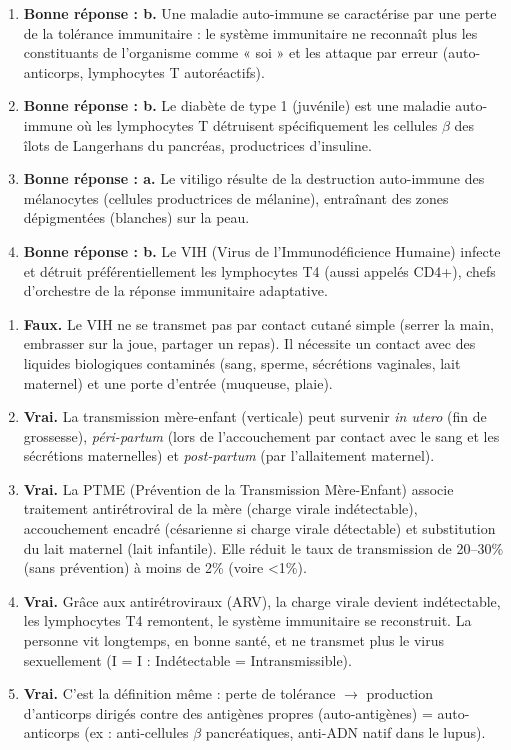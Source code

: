 \documentclass[11pt]{article}
\begin{document}
\begin{corrige}
\begin{enumerate}
\item \textbf{Bonne réponse : b.} Une maladie auto-immune se caractérise par une perte de la tolérance immunitaire : le système immunitaire ne reconnaît plus les constituants de l'organisme comme « soi » et les attaque par erreur (auto-anticorps, lymphocytes T autoréactifs).
\item \textbf{Bonne réponse : b.} Le diabète de type 1 (juvénile) est une maladie auto-immune où les lymphocytes T détruisent spécifiquement les cellules $\beta$ des îlots de Langerhans du pancréas, productrices d'insuline.
\item \textbf{Bonne réponse : a.} Le vitiligo résulte de la destruction auto-immune des mélanocytes (cellules productrices de mélanine), entraînant des zones dépigmentées (blanches) sur la peau.
\item \textbf{Bonne réponse : b.} Le VIH (Virus de l'Immunodéficience Humaine) infecte et détruit préférentiellement les lymphocytes T4 (aussi appelés CD4+), chefs d'orchestre de la réponse immunitaire adaptative.
\end{enumerate}
\end{corrige}

\begin{corrige}
\begin{enumerate}
\item \textbf{Faux.} Le VIH ne se transmet pas par contact cutané simple (serrer la main, embrasser sur la joue, partager un repas). Il nécessite un contact avec des liquides biologiques contaminés (sang, sperme, sécrétions vaginales, lait maternel) et une porte d'entrée (muqueuse, plaie).
\item \textbf{Vrai.} La transmission mère-enfant (verticale) peut survenir \emph{in utero} (fin de grossesse), \emph{péri-partum} (lors de l'accouchement par contact avec le sang et les sécrétions maternelles) et \emph{post-partum} (par l'allaitement maternel).
\item \textbf{Vrai.} La PTME (Prévention de la Transmission Mère-Enfant) associe traitement antirétroviral de la mère (charge virale indétectable), accouchement encadré (césarienne si charge virale détectable) et substitution du lait maternel (lait infantile). Elle réduit le taux de transmission de 20--30\% (sans prévention) à moins de 2\% (voire <1\%).
\item \textbf{Vrai.} Grâce aux antirétroviraux (ARV), la charge virale devient indétectable, les lymphocytes T4 remontent, le système immunitaire se reconstruit. La personne vit longtemps, en bonne santé, et ne transmet plus le virus sexuellement (I = I : Indétectable = Intransmissible).
\item \textbf{Vrai.} C'est la définition même : perte de tolérance $\rightarrow$ production d'anticorps dirigés contre des antigènes propres (auto-antigènes) = auto-anticorps (ex : anti-cellules $\beta$ pancréatiques, anti-ADN natif dans le lupus).
\end{enumerate}
\end{corrige}
\end{document}
